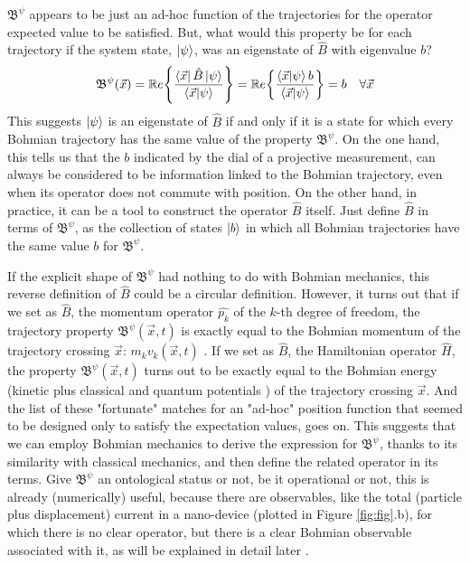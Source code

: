 \documentclass[11pt, a4paper]{article} %
\newcommand{\B}{\mathfrak{B}}
\begin{document}
$\B^\psi$ appears to be just an ad-hoc function of the trajectories for the operator expected value to be satisfied. But, what would this property be for each trajectory if the system state, $\ket{\psi}$, was an eigenstate of $\hat{B}$ with eigenvalue $b$?
\begin{equation}
\B^\psi(\vec{x})=\mathbb{R}e\qty{ \frac{\bra{\vec{x}}\hat{B}\ket{\psi}}{\bra{\vec{x}}\ket{\psi}} } = \mathbb{R}e\qty{ \frac{\bra{\vec{x}}\ket{\psi}b}{\bra{\vec{x}}\ket{\psi}} }=b\quad \forall \vec{x}
\end{equation}
This suggests $\ket{\psi}$ is an eigenstate of $\hat{B}$ if and only if it is a state for which every Bohmian trajectory has the same value of the property $\B^\psi$. On the one hand, this tells us that the $b$ indicated by the dial of a projective measurement, can always be considered to be information linked to the Bohmian trajectory, even when its operator does not commute with position. On the other hand, in practice, it can be a tool to construct the operator $\hat{B}$ itself. Just define $\hat{B}$ in terms of $\B^\psi$, as the collection of states $\ket{b}$ in which all Bohmian trajectories have the same value $b$ for $\B^\psi$.

If the explicit shape of $\B^\psi$ had nothing to do with Bohmian mechanics, this reverse definition of $\hat{B}$ could be a circular definition. However, it turns out that if we set as $\hat{B}$, the momentum operator $\hat{p_k}$ of the $k$-th degree of freedom, the trajectory property $\B^\psi(\vec{x},t)$ is exactly equal to the Bohmian momentum of the trajectory crossing $\vec{x}$: $m_k v_k(\vec{x},t)$ \cite{DevInPosition1}. If we set as $\hat{B}$, the Hamiltonian operator $\hat{H}$, the property $\B^\psi(\vec{x},t)$ turns out to be exactly equal to the Bohmian energy (kinetic plus classical and quantum potentials \cite{JordiXavier}) of the trajectory crossing $\vec{x}$. And the list of these "fortunate" matches for an "ad-hoc" position function that seemed to be designed only to satisfy the expectation values, goes on. This suggests that we can employ Bohmian mechanics to derive the expression for $\B^\psi$, thanks to its similarity with classical mechanics, and then define the related operator in its terms. Give $\B^\psi$ an ontological status or not, be it operational or not, this is already (numerically) useful, because there are observables, like the total (particle plus  displacement) current in a nano-device (plotted in Figure \ref{fig:fig}.b), for which there is no clear operator, but there is a clear Bohmian observable associated with it, as will be explained in detail later \cite{Pel, equiv}.
\end{document}
